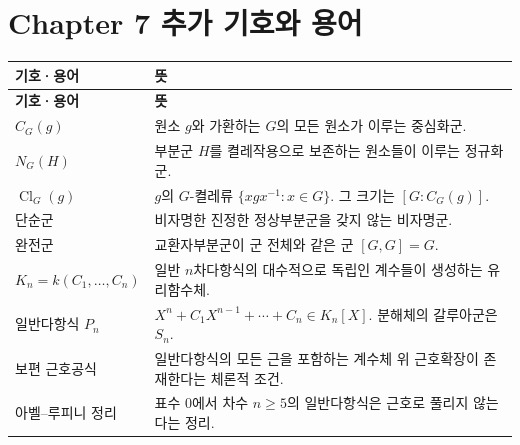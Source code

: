 \section*{Chapter 7 추가 기호와 용어}

\renewcommand{\arraystretch}{1.2}
\begin{longtable}{>{\raggedright\arraybackslash}p{}>{\raggedright\arraybackslash}p{}}
\toprule
\textbf{기호·용어} & \textbf{뜻} \\
\midrule
\endfirsthead
\toprule
\textbf{기호·용어} & \textbf{뜻} \\
\midrule
\endhead
\bottomrule
\endfoot

$C_G(g)$ & 원소 $g$와 가환하는 $G$의 모든 원소가 이루는 중심화군. \\
$N_G(H)$ & 부분군 $H$를 켤레작용으로 보존하는 원소들이 이루는 정규화군. \\
$\operatorname{Cl}_G(g)$ & $g$의 $G$-켤레류 $\{xgx^{-1}:x\in G\}$. 그 크기는 $[G:C_G(g)]$. \\
단순군 & 비자명한 진정한 정상부분군을 갖지 않는 비자명군. \\
완전군 & 교환자부분군이 군 전체와 같은 군 $[G,G]=G$. \\
$K_n=k(C_1,\dots,C_n)$ & 일반 $n$차다항식의 대수적으로 독립인 계수들이 생성하는 유리함수체. \\
일반다항식 $P_n$ & $X^n+C_1X^{n-1}+\cdots+C_n\in K_n[X]$. 분해체의 갈루아군은 $S_n$. \\
보편 근호공식 & 일반다항식의 모든 근을 포함하는 계수체 위 근호확장이 존재한다는 체론적 조건. \\
아벨--루피니 정리 & 표수 $0$에서 차수 $n\ge5$의 일반다항식은 근호로 풀리지 않는다는 정리. \\

\end{longtable}
